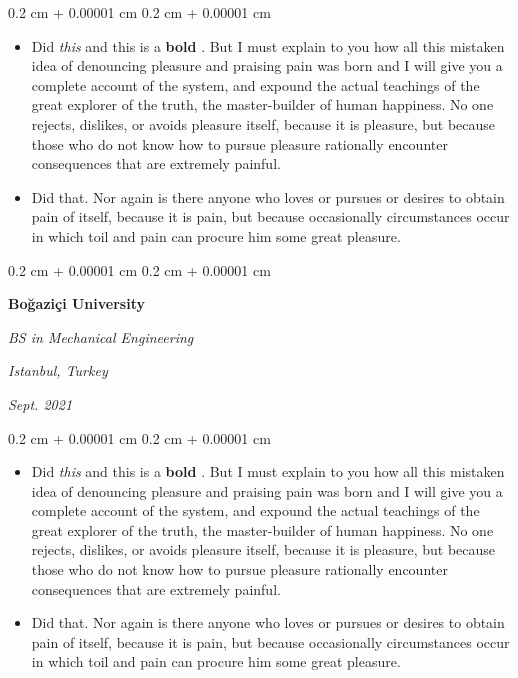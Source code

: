 \documentclass[10pt, letterpaper]{article}
\newenvironment{highlights}{
    \begin{itemize}[
        topsep=0.10 cm,
        parsep=0.10 cm,
        partopsep=0pt,
        itemsep=0pt,
        leftmargin=0.4 cm + 10pt + 0.6 cm
    ]
}{
    \end{itemize}
} %
\newenvironment{onecolentry}{
    \begin{adjustwidth}{
        0.2 cm + 0.00001 cm
    }{
        0.2 cm + 0.00001 cm
    }
}{
    \end{adjustwidth}
} %
\newenvironment{threecolentry}[3][]{
    \onecolentry
    \def\thirdColumn{#3}
    \setcolumnwidth{0.6 cm, \fill, 4.5 cm}
    \begin{paracol}{3}
    #2 \switchcolumn
}{
    \switchcolumn \raggedleft \thirdColumn
    \end{paracol}
    \endonecolentry
} %
\let\hrefWithoutArrow\href
\renewcommand{\href}[2]{\hrefWithoutArrow{#1}{\mbox{\ifthenelse{\equal{#2}{}}{ }{#2 }\raisebox{.15ex}{\footnotesize \faExternalLink*}}}}
\begin{document}
        \vspace{0.10 cm-3px}
        \begin{onecolentry}
            \begin{highlights}
                \item Did \textit{this} and this is a \textbf{bold} \href{https://example.com}{link}. But I must explain to you how all this mistaken idea of denouncing pleasure and praising pain was born and I will give you a complete account of the system, and expound the actual teachings of the great explorer of the truth, the master-builder of human happiness. No one rejects, dislikes, or avoids pleasure itself, because it is pleasure, but because those who do not know how to pursue pleasure rationally encounter consequences that are extremely painful.
                \item Did that. Nor again is there anyone who loves or pursues or desires to obtain pain of itself, because it is pain, but because occasionally circumstances occur in which toil and pain can procure him some great pleasure.
            \end{highlights}
        \end{onecolentry}


        \vspace{0.2 cm-3px}

        \begin{threecolentry}{
            \vspace*{\fill}
            \textbullet
            \vspace*{3px}
            \vspace*{\fill}
        }{
        \textit{Istanbul, Turkey}    
            
        \textit{Sept. 2021}}
            \textbf{Boğaziçi University}

            \textit{BS in Mechanical Engineering}
        \end{threecolentry}

        \vspace{0.10 cm-3px}
        \begin{onecolentry}
            \begin{highlights}
                \item Did \textit{this} and this is a \textbf{bold} \href{https://example.com}{link}. But I must explain to you how all this mistaken idea of denouncing pleasure and praising pain was born and I will give you a complete account of the system, and expound the actual teachings of the great explorer of the truth, the master-builder of human happiness. No one rejects, dislikes, or avoids pleasure itself, because it is pleasure, but because those who do not know how to pursue pleasure rationally encounter consequences that are extremely painful.
                \item Did that. Nor again is there anyone who loves or pursues or desires to obtain pain of itself, because it is pain, but because occasionally circumstances occur in which toil and pain can procure him some great pleasure.
            \end{highlights}
        \end{onecolentry}
\end{document}
